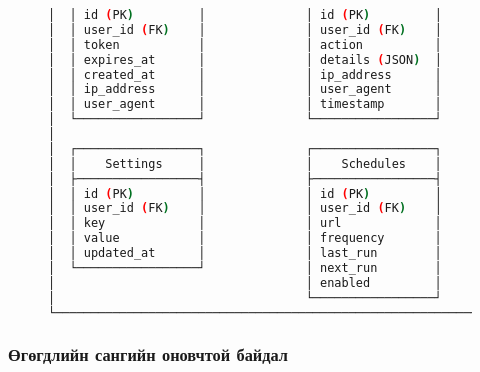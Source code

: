 \documentclass[main.tex]{subfiles}
\begin{document}
\begin{figure}[h]
\begin{lstlisting}[language=bash, caption=Database Entity Relationship диаграм]
│  │ id (PK)         │              │ id (PK)         │           │
│  │ user_id (FK)    │              │ user_id (FK)    │           │
│  │ token           │              │ action          │           │
│  │ expires_at      │              │ details (JSON)  │           │
│  │ created_at      │              │ ip_address      │           │
│  │ ip_address      │              │ user_agent      │           │
│  │ user_agent      │              │ timestamp       │           │
│  └─────────────────┘              └─────────────────┘           │
│                                                                 │
│  ┌─────────────────┐              ┌─────────────────┐           │
│  │    Settings     │              │    Schedules    │           │
│  ├─────────────────┤              ├─────────────────┤           │
│  │ id (PK)         │              │ id (PK)         │           │
│  │ user_id (FK)    │              │ user_id (FK)    │           │
│  │ key             │              │ url             │           │
│  │ value           │              │ frequency       │           │
│  │ updated_at      │              │ last_run        │           │
│  └─────────────────┘              │ next_run        │           │
│                                   │ enabled         │           │
│                                   └─────────────────┘           │
└─────────────────────────────────────────────────────────────────┘
\end{lstlisting}
\end{figure}

\subsubsection{Өгөгдлийн сангийн оновчтой байдал}
\end{document}
